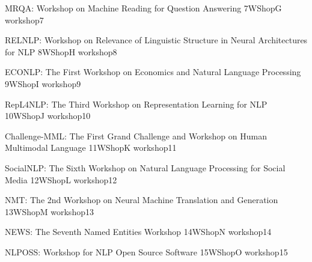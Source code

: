 \begin{wsschedule}
  {MRQA: Workshop on Machine Reading for Question Answering}
  {7}{WShopG}
  {workshop7}
  {\WShopLocG}
  
\end{wsschedule}

\begin{wsschedule}
  {RELNLP: Workshop on Relevance of Linguistic Structure in Neural 
  Architectures for NLP}
  {8}{WShopH}
  {workshop8}
  {\WShopLocH}
  
\end{wsschedule}
\newpage




\begin{wsschedule}
  {ECONLP: The First Workshop on Economics and Natural Language Processing}
  {9}{WShopI}
  {workshop9}
  {\WShopLocI}
  
\end{wsschedule}


\begin{wsschedule}
  {RepL4NLP: The Third Workshop on Representation Learning for NLP}
  {10}{WShopJ}
  {workshop10}
  {\WShopLocJ}
  
\end{wsschedule}

\begin{wsschedule}
  {Challenge-MML: The First Grand Challenge and Workshop on Human Multimodal Language}
  {11}{WShopK}
  {workshop11}
  {\WShopLocK}
  
\end{wsschedule}

\begin{wsschedule}
  {SocialNLP: The Sixth Workshop on Natural Language 
  Processing for Social Media}
  {12}{WShopL}
  {workshop12}
  {\WShopLocL}
  
\end{wsschedule}

\begin{wsschedule}
  {NMT: The 2nd Workshop on Neural Machine Translation and Generation}
  {13}{WShopM}
  {workshop13}
  {\WShopLocM}
  
\end{wsschedule}

\begin{wsschedule}
  {NEWS: The Seventh Named Entities Workshop}
  {14}{WShopN}
  {workshop14}
  {\WShopLocN}
  
\end{wsschedule}

\begin{wsschedule}
  {NLPOSS: Workshop for NLP Open Source Software}
  {15}{WShopO}
  {workshop15}
  {\WShopLocO}
  
\end{wsschedule}

